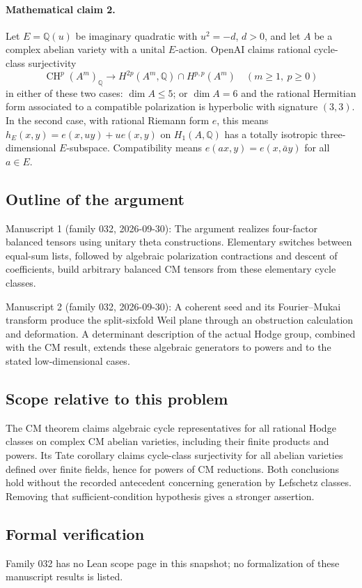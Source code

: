 \documentclass[11pt]{article}
\begin{document}
\paragraph{Mathematical claim 2.} Let $E=\mathbb Q(u)$ be imaginary quadratic with $u^2=-d$, $d>0$, and let $A$ be a complex abelian variety with a unital $E$-action. OpenAI claims rational cycle-class surjectivity
\[
\operatorname{CH}^p(A^m)_{\mathbb Q}\longrightarrow H^{2p}(A^m,\mathbb Q)\cap H^{p,p}(A^m)
\quad(m\ge1,\ p\ge0)
\]
in either of these two cases: $\dim A\le5$; or $\dim A=6$ and the rational Hermitian form associated to a compatible polarization is hyperbolic with signature $(3,3)$. In the second case, with rational Riemann form $e$, this means $h_E(x,y)=e(x,uy)+u e(x,y)$ on $H_1(A,\mathbb Q)$ has a totally isotropic three-dimensional $E$-subspace. Compatibility means $e(ax,y)=e(x,\bar a y)$ for all $a\in E$.

\subsection{Outline of the argument}
Manuscript 1 (family 032, 2026-09-30): The argument realizes four-factor balanced tensors using unitary theta constructions. Elementary switches between equal-sum lists, followed by algebraic polarization contractions and descent of coefficients, build arbitrary balanced CM tensors from these elementary cycle classes.

Manuscript 2 (family 032, 2026-09-30): A coherent seed and its Fourier--Mukai transform produce the split-sixfold Weil plane through an obstruction calculation and deformation. A determinant description of the actual Hodge group, combined with the CM result, extends these algebraic generators to powers and to the stated low-dimensional cases.

\subsection{Scope relative to this problem}
The CM theorem claims algebraic cycle representatives for all rational Hodge classes on complex CM abelian varieties, including their finite products and powers. Its Tate corollary claims cycle-class surjectivity for all abelian varieties defined over finite fields, hence for powers of CM reductions. Both conclusions hold without the recorded antecedent concerning generation by Lefschetz classes. Removing that sufficient-condition hypothesis gives a stronger assertion.

\subsection{Formal verification}
Family 032 has no Lean scope page in this snapshot; no formalization of these manuscript results is listed.
\end{document}
